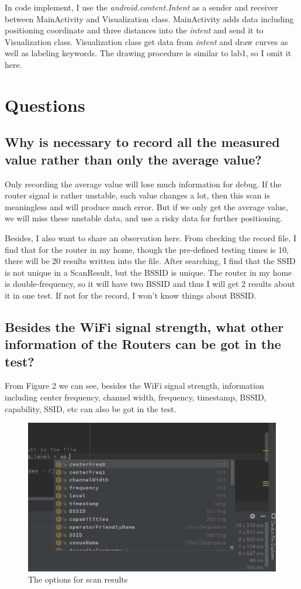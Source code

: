\documentclass{article}
\begin{document}
In code implement, I use the \textit{android.content.Intent} as a sender and receiver between MainActivity and Visualization class. MainActivity adds data including positioning coordinate and three distances into the \textit{intent} and send it to Visualization class. Visualization class get data from \textit{intent} and draw curves as well as labeling keywords. The drawing procedure is similar to lab1, so I omit it here.

\section{Questions}

\subsection{Why is necessary to record all the measured value rather than only the average value?}
Only recording the average value will lose much information for debug. If the router signal is rather unstable, each value changes a lot, then this scan is meaningless and will produce much error. But if we only get the average value, we will miss these unstable data, and use a risky data for further positioning.

Besides, I also want to share an observation here. From checking the record file, I find that for the router in my home, though the pre-defined testing times is 10, there will be 20 results written into the file. After searching, I find that the SSID is not unique in a ScanResult, but the BSSID is unique. The router in my home is double-frequency, so it will have two BSSID and thus I will get 2 results about it in one test. If not for the record, I won't know things about BSSID.

\subsection{Besides the WiFi signal strength, what other information of the Routers can be got in the test?}
From Figure 2 we can see, besides the WiFi signal strength, information including center frequency, channel width, frequency, timestamp, BSSID, capability, SSID, etc can also be got in the test.
\begin{figure}[htbp]
     \centering
     \includegraphics[width=0.7\linewidth]{extra_info.png}
     \caption{The options for scan results}
\end{figure}
\end{document}
